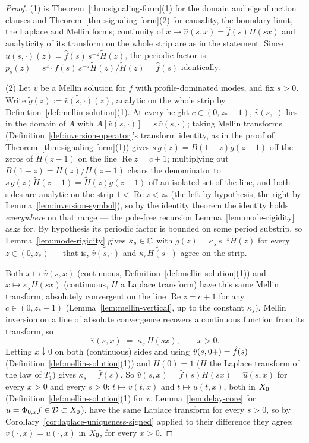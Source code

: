 \begin{proof}
(1) is Theorem~\ref{thm:signaling-form}(1) for the domain and eigenfunction clauses and
Theorem~\ref{thm:signaling-form}(2) for causality, the boundary limit, the Laplace and Mellin
forms; continuity of $x \mapsto \hat u(s,x) = \hat f(s)H(sx)$ and analyticity of its transform on
the whole strip are as in the statement. Since $\widetilde{\hat u(s,\cdot)}(z) =
\hat f(s)\,s^{-z}\tilde H(z)$, the periodic factor is
$p_s(z) = s^z\cdot\hat f(s)\,s^{-z}\tilde H(z)/\tilde H(z) = \hat f(s)$ identically.

(2) Let $v$ be a Mellin solution for $f$ with profile-dominated modes, and fix $s > 0$. Write
$\tilde g(z) := \widetilde{\hat v(s,\cdot)}(z)$, analytic on the whole strip by
Definition~\ref{def:mellin-solution}(1). At every height $c \in (0,z_*-1)$, $\hat v(s,\cdot)$ lies
in the domain of $A$ with $A[\hat v(s,\cdot)] = s\,\hat v(s,\cdot)$; taking Mellin transforms
(Definition~\ref{def:inversion-operator}'s transform identity, as in the proof of
Theorem~\ref{thm:signaling-form}(1)) gives $s\,\tilde g(z) = B(1-z)\tilde g(z-1)$ off the zeros of
$\tilde H(z-1)$ on the line $\operatorname{Re} z = c+1$; multiplying out
$B(1-z) = \tilde H(z)/\tilde H(z-1)$ clears the denominator to
$s\,\tilde g(z)\tilde H(z-1) = \tilde H(z)\tilde g(z-1)$ off an isolated set of the line, and both
sides are analytic on the strip $1 < \operatorname{Re} z < z_*$ (the left by hypothesis, the right by
Lemma~\ref{lem:inversion-symbol}), so by the identity theorem the identity holds \emph{everywhere}
on that range --- the pole-free recursion Lemma~\ref{lem:mode-rigidity} asks for. By hypothesis
its periodic factor is bounded on some period substrip, so Lemma~\ref{lem:mode-rigidity} gives
$\kappa_s \in \mathbb{C}$ with $\tilde g(z) = \kappa_s\,s^{-z}\tilde H(z)$ for every $z \in (0,z_*)$ ---
that is, $\widetilde{\hat v(s,\cdot)}$ and $\widetilde{\kappa_s H(s\cdot)}$ agree on the strip.

Both $x \mapsto \hat v(s,x)$ (continuous, Definition~\ref{def:mellin-solution}(1)) and
$x \mapsto \kappa_s H(sx)$ (continuous, $H$ a Laplace transform) have this same Mellin transform,
absolutely convergent on the line $\operatorname{Re} z = c+1$ for any $c \in (0,z_*-1)$
(Lemma~\ref{lem:mellin-vertical}, up to the constant $\kappa_s$). Mellin inversion on a line of
absolute convergence recovers a continuous function from its transform, so
\[
\hat v(s,x) \;=\; \kappa_s\,H(sx), \qquad x > 0.
\]
Letting $x \downarrow 0$ on both (continuous) sides and using $\hat v(s,0{+}) = \hat f(s)$
(Definition~\ref{def:mellin-solution}(1)) and $H(0) = 1$ ($H$ the Laplace transform of the law of
$T_1$) gives $\kappa_s = \hat f(s)$. So $\hat v(s,x) = \hat f(s)H(sx) = \hat u(s,x)$ for every
$x>0$ and every $s>0$: $t \mapsto v(t,x)$ and $t \mapsto u(t,x)$, both in $X_0$
(Definition~\ref{def:mellin-solution}(1) for $v$, Lemma~\ref{lem:delay-core} for
$u = \Phi_{0,x}f \in \mathcal{D} \subset X_0$), have the same Laplace transform for every $s>0$, so by
Corollary~\ref{cor:laplace-uniqueness-signed} %
applied to their difference
they agree: $v(\cdot,x) = u(\cdot,x)$ in $X_0$, for every $x>0$.
\end{proof}

